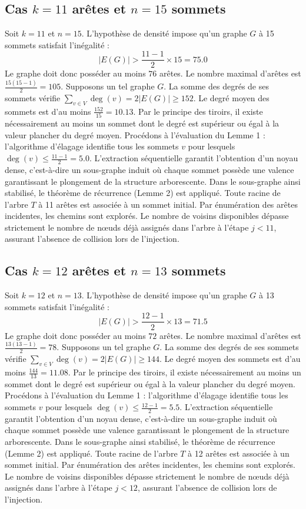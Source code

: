 \documentclass[12pt,a4paper]{article}
\begin{document}
\subsection{Cas $k = 11$ arêtes et $n = 15$ sommets}
Soit $k = 11$ et $n = 15$. L'hypothèse de densité impose qu'un graphe $G$ à 15 sommets satisfait l'inégalité :
$$ |E(G)| > \frac{11-1}{2} \times 15 = 75.0 $$
Le graphe doit donc posséder au moins $76$ arêtes. Le nombre maximal d'arêtes est $\frac{15(15-1)}{2} = 105$.
Supposons un tel graphe $G$. La somme des degrés de ses sommets vérifie $\sum_{v \in V} \deg(v) = 2|E(G)| \geq 152$.
Le degré moyen des sommets est d'au moins $\frac{152}{15} = 10.13$.
Par le principe des tiroirs, il existe nécessairement au moins un sommet dont le degré est supérieur ou égal à la valeur plancher du degré moyen.
Procédons à l'évaluation du Lemme 1 : l'algorithme d'élagage identifie tous les sommets $v$ pour lesquels $\deg(v) \leq \frac{11-1}{2} = 5.0$.
L'extraction séquentielle garantit l'obtention d'un noyau dense, c'est-à-dire un sous-graphe induit où chaque sommet possède une valence garantissant le plongement de la structure arborescente.
Dans le sous-graphe ainsi stabilisé, le théorème de récurrence (Lemme 2) est appliqué. Toute racine de l'arbre $T$ à 11 arêtes est associée à un sommet initial. Par énumération des arêtes incidentes, les chemins sont explorés. Le nombre de voisins disponibles dépasse strictement le nombre de nœuds déjà assignés dans l'arbre à l'étape $j < 11$, assurant l'absence de collision lors de l'injection.

\subsection{Cas $k = 12$ arêtes et $n = 13$ sommets}
Soit $k = 12$ et $n = 13$. L'hypothèse de densité impose qu'un graphe $G$ à 13 sommets satisfait l'inégalité :
$$ |E(G)| > \frac{12-1}{2} \times 13 = 71.5 $$
Le graphe doit donc posséder au moins $72$ arêtes. Le nombre maximal d'arêtes est $\frac{13(13-1)}{2} = 78$.
Supposons un tel graphe $G$. La somme des degrés de ses sommets vérifie $\sum_{v \in V} \deg(v) = 2|E(G)| \geq 144$.
Le degré moyen des sommets est d'au moins $\frac{144}{13} = 11.08$.
Par le principe des tiroirs, il existe nécessairement au moins un sommet dont le degré est supérieur ou égal à la valeur plancher du degré moyen.
Procédons à l'évaluation du Lemme 1 : l'algorithme d'élagage identifie tous les sommets $v$ pour lesquels $\deg(v) \leq \frac{12-1}{2} = 5.5$.
L'extraction séquentielle garantit l'obtention d'un noyau dense, c'est-à-dire un sous-graphe induit où chaque sommet possède une valence garantissant le plongement de la structure arborescente.
Dans le sous-graphe ainsi stabilisé, le théorème de récurrence (Lemme 2) est appliqué. Toute racine de l'arbre $T$ à 12 arêtes est associée à un sommet initial. Par énumération des arêtes incidentes, les chemins sont explorés. Le nombre de voisins disponibles dépasse strictement le nombre de nœuds déjà assignés dans l'arbre à l'étape $j < 12$, assurant l'absence de collision lors de l'injection.
\end{document}
